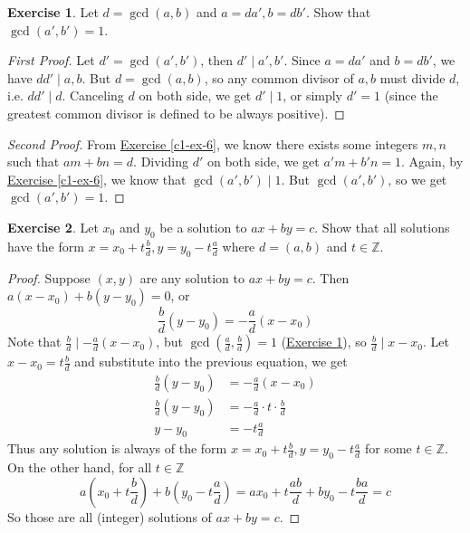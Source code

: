 \documentclass{article}
\theoremstyle{definition}
\newtheorem{exercise}{Exercise}
\begin{document}
\newpage

\begin{exercise} \label{c1-ex-7}
Let $d = \gcd(a, b)$ and $a = da', b = db'$. Show that $\gcd(a', b') = 1$.
\end{exercise}
\begin{proof}[First Proof]
Let $d' = \gcd(a', b')$, then $d' \mid a', b'$. Since $a = da'$ and $b = db'$, we have $d d' \mid a, b$. But $d = \gcd(a, b)$, so any common divisor of $a, b$ must divide $d$, i.e. $d d' \mid d$. Canceling $d$ on both side, we get $d' \mid 1$, or simply $d' = 1$ (since the greatest common divisor is defined to be always positive).
\end{proof}
\begin{proof}[Second Proof]
From \hyperref[c1-ex-6]{Exercise \ref*{c1-ex-6}}, we know there exists some integers $m, n$ such that $am + bn = d$. Dividing $d'$ on both side, we get $a' m + b' n = 1$. Again, by \hyperref[c1-ex-6]{Exercise \ref*{c1-ex-6}}, we know that $\gcd(a', b') \mid 1$. But $\gcd(a', b')$, so we get $\gcd(a', b') = 1$.
\end{proof}

\newpage

\begin{exercise}
Let $x_0$ and $y_0$ be a solution to $ax + by = c$. Show that all solutions have the form $x = x_0 + t \frac{b}{d}, y = y_0 - t \frac{a}{d}$ where $d = (a, b)$ and $t \in \mathbb{Z}$.
\end{exercise}
\begin{proof}
Suppose $(x, y)$ are any solution to $ax + by = c$. Then $a(x - x_0) + b (y - y_0) = 0$, or
$$\frac{b}{d} (y - y_0) = - \frac{a}{d} (x - x_0)$$
Note that $\frac{b}{d} \mid - \frac{a}{d} (x - x_0)$, but $\gcd \left( \frac{a}{d}, \frac{b}{d} \right) = 1$ (\hyperref[c1-ex-7]{Exercise \ref*{c1-ex-7}}), so $\frac{b}{d} \mid x - x_0$. Let $x - x_0 = t \frac{b}{d}$ and substitute into the previous equation, we get
\begin{align*}
\frac{b}{d} (y - y_0) & = - \frac{a}{d} (x - x_0) \\
\frac{b}{d} (y - y_0) & = - \frac{a}{d} \cdot t \cdot \frac{b}{d} \\
y - y_0 & = - t \frac{a}{d}
\end{align*}
Thus any solution is always of the form $x = x_0 + t \frac{b}{d}, y = y_0 - t \frac{a}{d}$ for some $t \in \mathbb{Z}$. On the other hand, for all $t \in \mathbb{Z}$
$$a \left( x_0 + t \frac{b}{d} \right) + b \left( y_0 - t \frac{a}{d} \right) =a x_0 + t \frac{ab}{d} + b y_0 - t \frac{ba}{d} = c$$
So those are all (integer) solutions of $ax + by = c$.
\end{proof}
\end{document}
